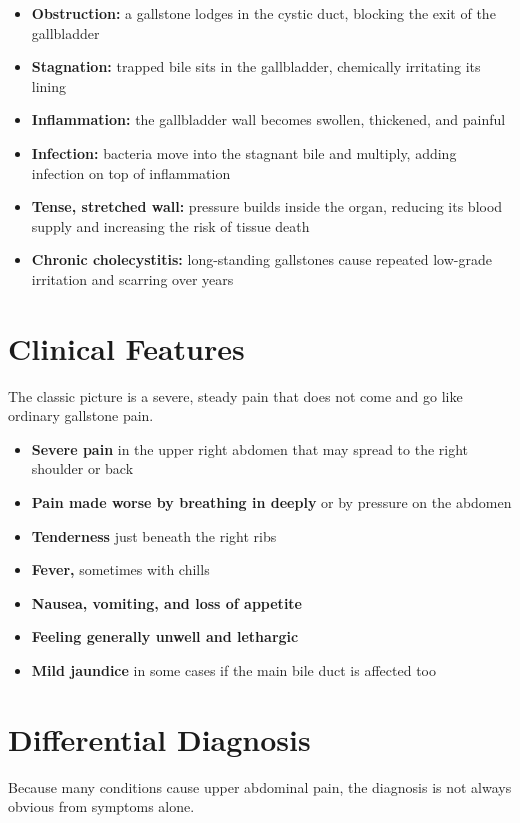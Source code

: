 \begin{itemize}
    \item \textbf{Obstruction:} a gallstone lodges in the cystic duct, blocking the exit of the gallbladder
    \item \textbf{Stagnation:} trapped bile sits in the gallbladder, chemically irritating its lining
    \item \textbf{Inflammation:} the gallbladder wall becomes swollen, thickened, and painful
    \item \textbf{Infection:} bacteria move into the stagnant bile and multiply, adding infection on top of inflammation
    \item \textbf{Tense, stretched wall:} pressure builds inside the organ, reducing its blood supply and increasing the risk of tissue death
    \item \textbf{Chronic cholecystitis:} long-standing gallstones cause repeated low-grade irritation and scarring over years
\end{itemize}

\section*{Clinical Features}
The classic picture is a severe, steady pain that does not come and go like ordinary gallstone pain.

\begin{itemize}
    \item \textbf{Severe pain} in the upper right abdomen that may spread to the right shoulder or back
    \item \textbf{Pain made worse by breathing in deeply} or by pressure on the abdomen
    \item \textbf{Tenderness} just beneath the right ribs
    \item \textbf{Fever,} sometimes with chills
    \item \textbf{Nausea, vomiting, and loss of appetite}
    \item \textbf{Feeling generally unwell and lethargic}
    \item \textbf{Mild jaundice} in some cases if the main bile duct is affected too
\end{itemize}

\section*{Differential Diagnosis}
Because many conditions cause upper abdominal pain, the diagnosis is not always obvious from symptoms alone.

